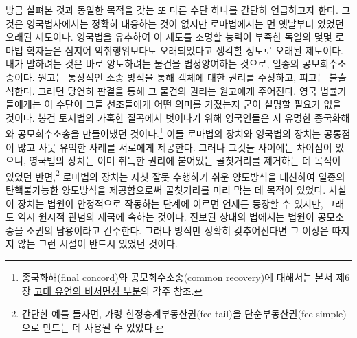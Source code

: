 방금 살펴본 것과 동일한 목적을 갖는 또 다른 수단 하나를
간단히 언급하고자 한다.
그것은 영국법사에서는 정확히 대응하는 것이 없지만
로마법에서는 먼 옛날부터 있었던 오래된 제도이다.
영국법을 유추하여 이 제도를 조명할 능력이 부족한
독일의 몇몇 로마법 학자들은 심지어 악취행위보다도 오래되었다고
생각할 정도로 오래된 제도이다.
내가 말하려는 것은 바로
양도하려는 물건을
법정양여하는 것으로,
일종의 공모회수소송이다.
원고는 통상적인 소송 방식을 통해 객체에 대한 권리를 주장하고,
피고는 불출석한다. 그러면 당연히 판결을 통해 그 물건의 권리는
원고에게 주어진다.
영국 법률가들에게는
이 수단이 그들 선조들에게 어떤 의미를 가졌는지 굳이 설명할 필요가 없을 것이다.
봉건 토지법의 가혹한 질곡에서 벗어나기 위해
영국인들은
저 유명한
종국화해와 공모회수소송을 만들어냈던
것이다.\footnote{%
  종국화해(final concord)와 공모회수소송(common recovery)에 대해서는
  본서 제6장 \hyperlink{finerecovery}{고대 유언의 비서면성 부분}의 각주 참조.
  }
이들 로마법의 장치와 영국법의 장치는 공통점이 많고
사뭇 유익한 사례를 서로에게 제공한다.
그러나 그것들 사이에는 차이점이 있으니,
영국법의 장치는
이미 취득한 권리에 붙어있는 골칫거리를 제거하는 데 목적이 있었던
반면,\footnote{%
  간단한 예를 들자면,
  가령 한정승계부동산권(fee tail)을 단순부동산권(fee simple)으로
  만드는 데 사용될 수 있었다.
  }
로마법의 장치는
자칫 잘못 수행하기 쉬운 양도방식을 대신하여
일종의 탄핵불가능한 양도방식을 제공함으로써 골칫거리를 미리 막는 데
목적이 있었다.
사실 이 장치는 법원이 안정적으로 작동하는 단계에 이르면
언제든 등장할 수 있지만,
그래도 역시 원시적 관념의 제국에 속하는 것이다.
진보된 상태의 법에서는 법원이
공모소송을 소권의 남용이라고 간주한다.
그러나 방식만 정확히 갖추어진다면
그 이상은 따지지 않는 그런 시절이 반드시 있었던 것이다.

